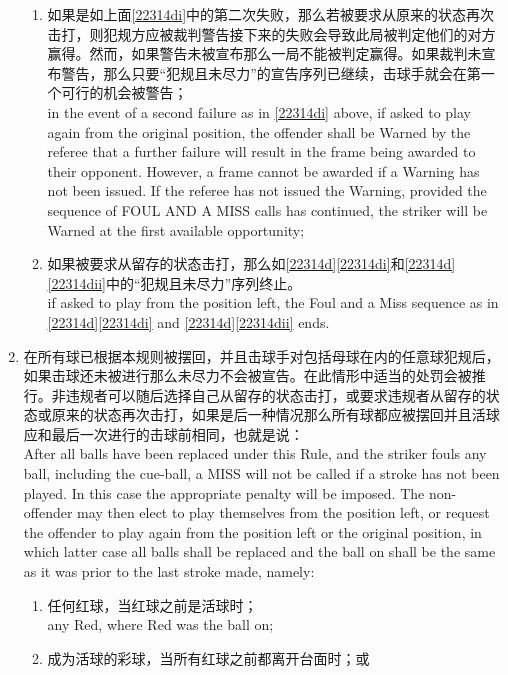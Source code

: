 \begin{enumerate}[label=(\alph*)]
\begin{enumerate}[label=(\roman*)]
        \item \label{22314dii}如果是如上面\ref{22314di}中的第二次失败，那么若被要求从原来的状态再次击打，则犯规方应被裁判警告接下来的失败会导致此局被判定他们的对方赢得。然而，如果警告未被宣布那么一局不能被判定赢得。如果裁判未宣布警告，那么只要``犯规且未尽力''的宣告序列已继续，击球手就会在第一个可行的机会被警告；\\
        in the event of a second failure as in \ref{22314di} above, if asked to play again from the original position, the offender shall be Warned by the referee that a further failure will result in the frame being awarded to their opponent. However, a frame cannot be awarded if a Warning has not been issued. If the referee has not issued the Warning, provided the sequence of FOUL AND A MISS calls has continued, the striker will be Warned at the first available opportunity;
        \item 如果被要求从留存的状态击打，那么如\ref{22314d}\ref{22314di}和\ref{22314d} \ref{22314dii}中的``犯规且未尽力''序列终止。\\
        if asked to play from the position left, the Foul and a Miss sequence as in \ref{22314d}\ref{22314di} and \ref{22314d}\ref{22314dii} ends.
    \end{enumerate}
    \item \label{22314e}在所有球已根据本规则被摆回，并且击球手对包括母球在内的任意球犯规后，如果击球还未被进行那么未尽力不会被宣告。在此情形中适当的处罚会被推行。非违规者可以随后选择自己从留存的状态击打，或要求违规者从留存的状态或原来的状态再次击打，如果是后一种情况那么所有球都应被摆回并且活球应和最后一次进行的击球前相同，也就是说：\\
    After all balls have been replaced under this Rule, and the striker fouls any ball, including the cue-ball, a MISS will not be called if a stroke has not been played. In this case the appropriate penalty will be imposed. The non-offender may then elect to play themselves from the position left, or request the offender to play again from the position left or the original position, in which latter case all balls shall be replaced and the ball on shall be the same as it was prior to the last stroke made, namely:
    \begin{enumerate}[label=(\roman*)]
        \item 任何红球，当红球之前是活球时；\\
        any Red, where Red was the ball on;
        \item 成为活球的彩球，当所有红球之前都离开台面时；或\\

\end{enumerate}
\end{enumerate}
